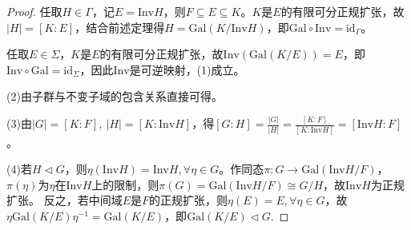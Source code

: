 \documentclass[../../main.tex]{subfiles}%
\begin{document}
\begin{proof}
任取$H\in\Gamma$，记$E=\mathrm{Inv}H$，则$F\subseteq E\subseteq K$。$K$是$E$的有限可分正规扩张，故$|H|=[K:E]$，结合前述定理得$H=\mathrm{Gal}(K/\mathrm{Inv}H)$，即$\mathrm{Gal}\circ\mathrm{Inv}=\mathrm{id}_\Gamma$。

任取$E\in\Sigma$，$K$是$E$的有限可分正规扩张，故$\mathrm{Inv}(\mathrm{Gal}(K/E))=E$，即$\mathrm{Inv}\circ\mathrm{Gal}=\mathrm{id}_\Sigma$，因此$\mathrm{Inv}$是可逆映射，(1)成立。

(2)由子群与不变子域的包含关系直接可得。

(3)由$|G|=[K:F],\ |H|=[K:\mathrm{Inv}H]$，得$[G:H]=\frac{|G|}{|H|}=\frac{[K:F]}{[K:\mathrm{Inv}H]}=[\mathrm{Inv}H:F]$。

(4)若$H\lhd G$，则$\eta(\mathrm{Inv}H)=\mathrm{Inv}H,\forall\eta\in G$。作同态$\pi:G\to\mathrm{Gal}(\mathrm{Inv}H/F)$，$\pi(\eta)$为$\eta$在$\mathrm{Inv}H$上的限制，则$\pi(G)=\mathrm{Gal}(\mathrm{Inv}H/F)\cong G/H$，故$\mathrm{Inv}H$为正规扩张。
反之，若中间域$E$是$F$的正规扩张，则$\eta(E)=E,\forall\eta\in G$，故$\eta\mathrm{Gal}(K/E)\eta^{-1}=\mathrm{Gal}(K/E)$，即$\mathrm{Gal}(K/E)\lhd G$.
\end{proof}
\end{document}
